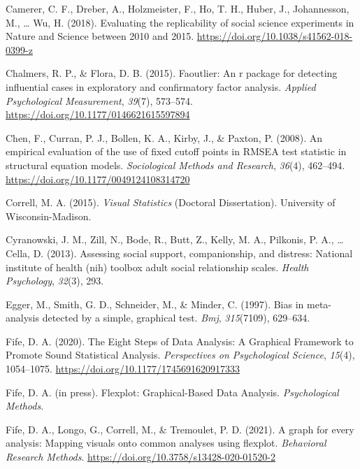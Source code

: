 \documentclass[
  english,
  man]{apa6}
\newlength{\cslhangindent}
\newenvironment{cslreferences}%
  {\setlength{\parindent}{0pt}%
  \everypar{\setlength{\hangindent}{\cslhangindent}}\ignorespaces}%
  {\par}
\begin{document}
\begin{cslreferences}
\leavevmode\hypertarget{ref-Camerer2018}{}%
Camerer, C. F., Dreber, A., Holzmeister, F., Ho, T. H., Huber, J., Johannesson, M., \ldots{} Wu, H. (2018). Evaluating the replicability of social science experiments in Nature and Science between 2010 and 2015. \url{https://doi.org/10.1038/s41562-018-0399-z}

\leavevmode\hypertarget{ref-faoutlier}{}%
Chalmers, R. P., \& Flora, D. B. (2015). Faoutlier: An r package for detecting influential cases in exploratory and confirmatory factor analysis. \emph{Applied Psychological Measurement}, \emph{39}(7), 573--574. \url{https://doi.org/10.1177/0146621615597894}

\leavevmode\hypertarget{ref-Chen2008}{}%
Chen, F., Curran, P. J., Bollen, K. A., Kirby, J., \& Paxton, P. (2008). An empirical evaluation of the use of fixed cutoff points in RMSEA test statistic in structural equation models. \emph{Sociological Methods and Research}, \emph{36}(4), 462--494. \url{https://doi.org/10.1177/0049124108314720}

\leavevmode\hypertarget{ref-Correll2015}{}%
Correll, M. A. (2015). \emph{Visual Statistics} (Doctoral Dissertation). University of Wisconsin-Madison.

\leavevmode\hypertarget{ref-cyranowski2013assessing}{}%
Cyranowski, J. M., Zill, N., Bode, R., Butt, Z., Kelly, M. A., Pilkonis, P. A., \ldots{} Cella, D. (2013). Assessing social support, companionship, and distress: National institute of health (nih) toolbox adult social relationship scales. \emph{Health Psychology}, \emph{32}(3), 293.

\leavevmode\hypertarget{ref-egger1997bias}{}%
Egger, M., Smith, G. D., Schneider, M., \& Minder, C. (1997). Bias in meta-analysis detected by a simple, graphical test. \emph{Bmj}, \emph{315}(7109), 629--634.

\leavevmode\hypertarget{ref-Fife2019e}{}%
Fife, D. A. (2020). The Eight Steps of Data Analysis: A Graphical Framework to Promote Sound Statistical Analysis. \emph{Perspectives on Psychological Science}, \emph{15}(4), 1054--1075. \url{https://doi.org/10.1177/1745691620917333}

\leavevmode\hypertarget{ref-Fife_flexplot}{}%
Fife, D. A. (in press). Flexplot: Graphical-Based Data Analysis. \emph{Psychological Methods}.

\leavevmode\hypertarget{ref-Fifemapping}{}%
Fife, D. A., Longo, G., Correll, M., \& Tremoulet, P. D. (2021). A graph for every analysis: Mapping visuals onto common analyses using flexplot. \emph{Behavioral Research Methods}. \url{https://doi.org/10.3758/s13428-020-01520-2}


\end{cslreferences}
\end{document}

